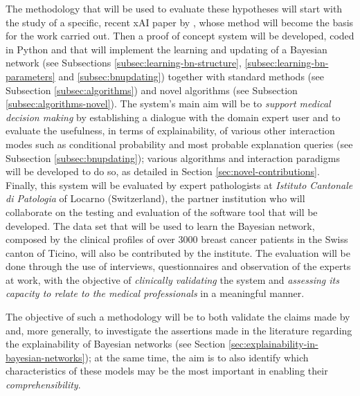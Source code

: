 The methodology that will be used to evaluate these hypotheses will start with the study of a specific, recent xAI paper by \citet{Butz2018}, whose method will become the basis for the work carried out.
Then a proof of concept system will be developed, coded in Python and that will implement the learning and updating of a Bayesian network (see Subsections \ref{subsec:learning-bn-structure}, \ref{subsec:learning-bn-parameters} and \ref{subsec:bnupdating}) together with standard methods (see Subsection \ref{subsec:algorithms}) and novel algorithms (see Subsection \ref{subsec:algorithms-novel}).
The system's main aim will be to \textit{support medical decision making} by establishing a dialogue with the domain expert user and to evaluate the usefulness, in terms of explainability, of various other interaction modes such as conditional probability and most probable explanation queries (see Subsection \ref{subsec:bnupdating}); various algorithms and interaction paradigms will be developed to do so, as detailed in Section \ref{sec:novel-contributions}.
Finally, this system will be evaluated by expert pathologists at \textit{Istituto Cantonale di Patologia} of Locarno (Switzerland), the partner institution who will collaborate on the testing and evaluation of the software tool that will be developed.
The data set that will be used to learn the Bayesian network, composed by the clinical profiles of over 3000 breast cancer patients in the Swiss canton of Ticino, will also be contributed by the institute.
The evaluation will be done through the use of interviews, questionnaires and observation of the experts at work, with the objective of \textit{clinically validating} the system and \textit{assessing its capacity to relate to the medical professionals} in a meaningful manner.

The objective of such a methodology will be to both validate the claims made by \citet{Butz2018} and, more generally, to investigate the assertions made in the literature regarding the explainability of Bayesian networks (see Section \ref{sec:explainability-in-bayesian-networks}); at the same time, the aim is to also identify which characteristics of these models may be the most important in enabling their \textit{comprehensibility}.